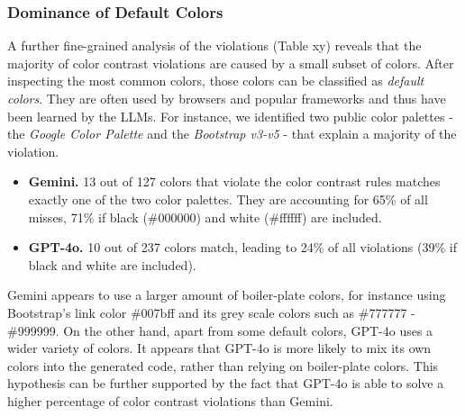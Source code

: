 \subsubsection{Dominance of Default Colors}
A further fine-grained analysis of the violations (Table xy) reveals that the 
majority of color contrast violations are caused by a small subset of colors.
After inspecting the most common colors, those colors can
be classified as \textit{default colors}. They are often used by browsers and 
popular frameworks and thus have been learned by the LLMs. For instance, we 
identified two public color palettes - the \textit{Google Color Palette} and the
\textit{Bootstrap v3-v5} - that explain a majority of the violation.
\begin{itemize}
  \item \textbf{Gemini.} 13 out of 127 colors that violate the color contrast 
  rules matches exactly one of the two color palettes. They are accounting for 
  65\% of all misses, 71\% if black (\#000000) and white (\#ffffff) are included.
  \item \textbf{GPT-4o.} 10 out of 237 colors match, leading to 24\% of all violations 
  (39\% if black and white are included).
\end{itemize}

Gemini appears to use a larger amount of boiler-plate colors, for instance 
using Bootstrap's link color \#007bff and its grey scale colors such as 
\#777777 - \#999999. \newline
On the other hand, apart from some default colors, GPT-4o uses a wider variety 
of colors. It appears that GPT-4o is more likely to mix its own colors into the
generated code, rather than relying on boiler-plate colors. This hypothesis
can be further supported by the fact that GPT-4o is able to solve a higher 
percentage of color contrast violations than Gemini. \newline


